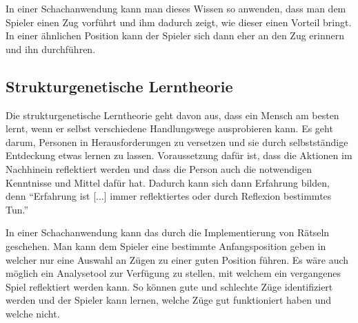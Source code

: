 In einer Schachanwendung kann man dieses Wissen so anwenden, dass man dem Spieler einen Zug vorführt und ihm dadurch zeigt,
wie dieser einen Vorteil bringt.
In einer ähnlichen Position kann der Spieler sich dann eher an den Zug erinnern und ihn durchführen.

\subsection{Strukturgenetische Lerntheorie}
Die strukturgenetische Lerntheorie geht davon aus, dass ein Mensch am besten lernt, wenn er selbst verschiedene Handlungswege ausprobieren kann. Es geht darum, Personen in Herausforderungen zu versetzen und sie durch selbstständige Entdeckung etwas lernen zu lassen. Voraussetzung dafür ist, dass die Aktionen im Nachhinein reflektiert werden und dass die Person auch die notwendigen Kenntnisse und Mittel dafür hat. Dadurch kann sich dann Erfahrung bilden, denn \enquote{Erfahrung ist [...] immer reflektiertes oder durch Reflexion bestimmtes Tun.}\cite{kron_grundwissen_2024}

In einer Schachanwendung kann das durch die Implementierung von Rätseln geschehen. Man kann dem Spieler eine bestimmte Anfangsposition geben in welcher nur eine Auswahl an Zügen zu einer guten Position führen. Es wäre auch möglich ein Analysetool zur Verfügung zu stellen, mit welchem ein vergangenes Spiel reflektiert werden kann. So können gute und schlechte Züge identifiziert werden und der Spieler kann lernen, welche Züge gut funktioniert haben und welche nicht.


